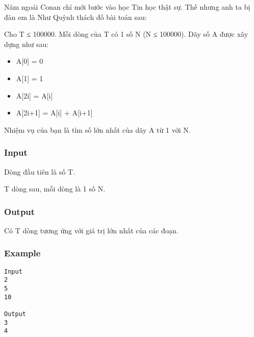 



   Năm ngoái Conan chỉ mới bước vào học Tin học thật sự. Thế nhưng anh ta bị đàn em là Như Quỳnh thách đố bài toán sau:  

   Cho T ≤ 100000. Mỗi dòng của T có 1 số N (N ≤ 100000). Dãy số A được xây dựng như sau:  
\begin{itemize}
	\item     A[0]    = 0   
	\item     A[1]    = 1   
	\item     A[2i]   = A[i]   
	\item     A[2i+1] = A[i] + A[i+1]   
\end{itemize}

   Nhiệm vụ của bạn là tìm số lớn nhất của dãy A từ 1 với N.  

\subsubsection{   Input  }

   Dòng đầu tiên là số T.  

   T dòng sau, mỗi dòng là 1 số N.  

\subsubsection{   Output  }

   Có T dòng tương ứng với giá trị lớn nhất của các đoạn.  

\subsubsection{   Example  }
\begin{verbatim}
Input
2
5
10

Output
3
4
\end{verbatim}